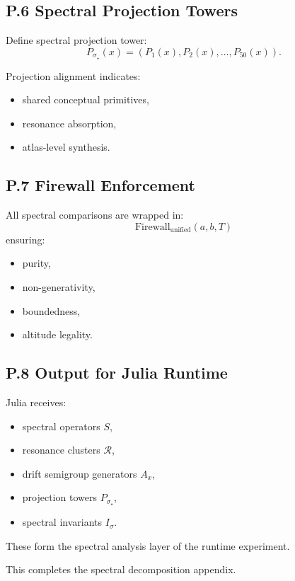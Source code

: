 \subsection*{P.6 Spectral Projection Towers}

Define spectral projection tower:
\[
P_{\sigma_{\star}}(x)
=
(P_1(x), P_2(x), \dots, P_{50}(x)).
\]

Projection alignment indicates:
\begin{itemize}
    \item shared conceptual primitives,
    \item resonance absorption,
    \item atlas-level synthesis.
\end{itemize}

\subsection*{P.7 Firewall Enforcement}

All spectral comparisons are wrapped in:
\[
\mathrm{Firewall}_{\mathrm{unified}}(a,b,T)
\]
ensuring:
\begin{itemize}
    \item purity,
    \item non-generativity,
    \item boundedness,
    \item altitude legality.
\end{itemize}

\subsection*{P.8 Output for Julia Runtime}

Julia receives:
\begin{itemize}
    \item spectral operators $S$,
    \item resonance clusters $\mathcal{R}$,
    \item drift semigroup generators $A_x$,
    \item projection towers $P_{\sigma_{\star}}$,
    \item spectral invariants $I_{\sigma}$.
\end{itemize}

These form the spectral analysis layer of the runtime experiment.

This completes the spectral decomposition appendix.
